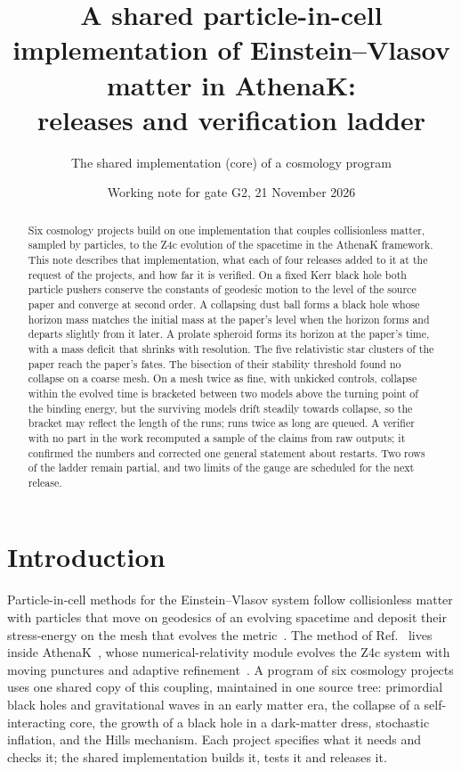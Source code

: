 \documentclass[aps,prd,twocolumn,superscriptaddress,nofootinbib,floatfix]{revtex4-2}
\begin{document}
\title{A shared particle-in-cell implementation of Einstein--Vlasov matter in AthenaK:\\
releases and verification ladder}

\author{The shared implementation (core) of a cosmology program}
\date{Working note for gate G2, 21 November 2026}

\begin{abstract}
Six cosmology projects build on one implementation that couples collisionless matter,
sampled by particles, to the Z4c evolution of the spacetime in the AthenaK framework.
This note describes that implementation, what each of four releases added to it at the
request of the projects, and how far it is verified. On a fixed Kerr black hole both
particle pushers conserve the constants of geodesic motion to the level of the source
paper and converge at second order. A collapsing dust ball forms a black hole whose
horizon mass matches the initial mass at the paper's level when the horizon forms and
departs slightly from it later. A prolate spheroid forms its horizon at the paper's
time, with a mass deficit that shrinks with resolution. The five relativistic star
clusters of the paper reach the paper's fates. The bisection of their stability
threshold found no collapse on a coarse mesh. On a mesh twice as fine, with unkicked
controls, collapse within the evolved time is bracketed between two models above the turning
point of the binding energy, but the surviving models drift steadily towards collapse,
so the bracket may reflect the length of the runs; runs twice as long are queued. A
verifier with no part in the work recomputed a sample of the claims from raw outputs;
it confirmed the numbers and corrected one general statement about restarts. Two rows
of the ladder remain partial, and two limits of the gauge are scheduled for the next
release.
\end{abstract}

\maketitle

\section{Introduction}

Particle-in-cell methods for the Einstein--Vlasov system follow collisionless matter
with particles that move on geodesics of an evolving spacetime and deposit their
stress-energy on the mesh that evolves the metric~\cite{Wu:2026pic}. The method of
Ref.~\cite{Wu:2026pic} lives inside AthenaK~\cite{2026ApJS..283...27S}, whose
numerical-relativity module evolves the Z4c system with moving punctures and adaptive
refinement~\cite{Zhu:2024utz}. A program of six cosmology projects uses one shared copy
of this coupling, maintained in one source tree: primordial black holes and
gravitational waves in an early matter era, the collapse of a self-interacting core,
the growth of a black hole in a dark-matter dress, stochastic inflation, and the Hills
mechanism. Each project specifies what it needs and checks it; the shared
implementation builds it, tests it and releases it.
\end{document}
